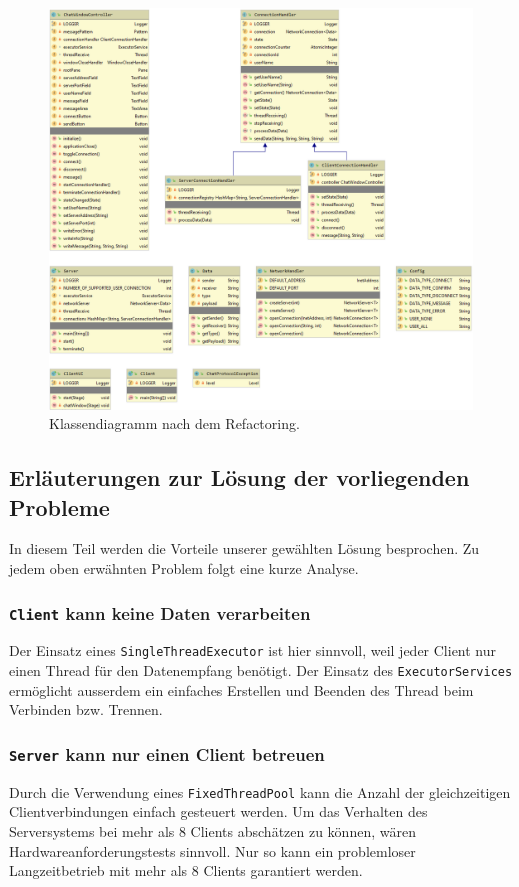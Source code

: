 \documentclass[10pt, hyperref, a4paper]{article}
\begin{document}
	\begin{figure}[bht!]
		\centering
		\includegraphics[width=14cm]{..//diagramV3}
		\captionsetup{width=14cm}
		\caption{Klassendiagramm nach dem Refactoring.}
		\label{fig:v3}
	\end{figure}





\subsection{Erläuterungen zur Lösung der vorliegenden Probleme}
In diesem Teil werden die Vorteile unserer gewählten Lösung besprochen. Zu jedem oben erwähnten Problem folgt eine kurze Analyse.

\subsubsection{\texttt{Client} kann keine Daten verarbeiten}
Der Einsatz eines \texttt{SingleThreadExecutor} ist hier sinnvoll, weil jeder Client nur einen Thread für den Datenempfang benötigt. Der Einsatz des \texttt{ExecutorServices} ermöglicht ausserdem ein einfaches Erstellen und Beenden des Thread beim Verbinden bzw. Trennen.

\subsubsection{\texttt{Server} kann nur einen Client betreuen}
Durch die Verwendung eines \texttt{FixedThreadPool} kann die Anzahl der gleichzeitigen Clientverbindungen einfach gesteuert werden. Um das Verhalten des Serversystems bei mehr als 8 Clients abschätzen zu können, wären Hardwareanforderungstests sinnvoll. Nur so kann ein problemloser Langzeitbetrieb mit mehr als 8 Clients garantiert werden. 
\end{document}
